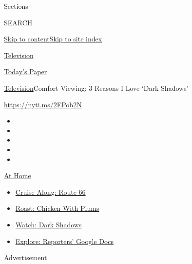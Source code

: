 Sections

SEARCH

\protect\hyperlink{site-content}{Skip to
content}\protect\hyperlink{site-index}{Skip to site index}

\href{https://www.nytimes3xbfgragh.onion/section/arts/television}{Television}

\href{https://myaccount.nytimes3xbfgragh.onion/auth/login?response_type=cookie\&client_id=vi}{}

\href{https://www.nytimes3xbfgragh.onion/section/todayspaper}{Today's
Paper}

\href{/section/arts/television}{Television}\textbar{}Comfort Viewing: 3
Reasons I Love `Dark Shadows'

\url{https://nyti.ms/2EPob2N}

\begin{itemize}
\item
\item
\item
\item
\item
\end{itemize}

\href{https://www.nytimes3xbfgragh.onion/spotlight/at-home?action=click\&pgtype=Article\&state=default\&region=TOP_BANNER\&context=at_home_menu}{At
Home}

\begin{itemize}
\tightlist
\item
  \href{https://www.nytimes3xbfgragh.onion/2020/09/07/travel/route-66.html?action=click\&pgtype=Article\&state=default\&region=TOP_BANNER\&context=at_home_menu}{Cruise
  Along: Route 66}
\item
  \href{https://www.nytimes3xbfgragh.onion/2020/09/04/dining/sheet-pan-chicken.html?action=click\&pgtype=Article\&state=default\&region=TOP_BANNER\&context=at_home_menu}{Roast:
  Chicken With Plums}
\item
  \href{https://www.nytimes3xbfgragh.onion/2020/09/04/arts/television/dark-shadows-stream.html?action=click\&pgtype=Article\&state=default\&region=TOP_BANNER\&context=at_home_menu}{Watch:
  Dark Shadows}
\item
  \href{https://www.nytimes3xbfgragh.onion/interactive/2020/at-home/even-more-reporters-editors-diaries-lists-recommendations.html?action=click\&pgtype=Article\&state=default\&region=TOP_BANNER\&context=at_home_menu}{Explore:
  Reporters' Google Docs}
\end{itemize}

Advertisement

